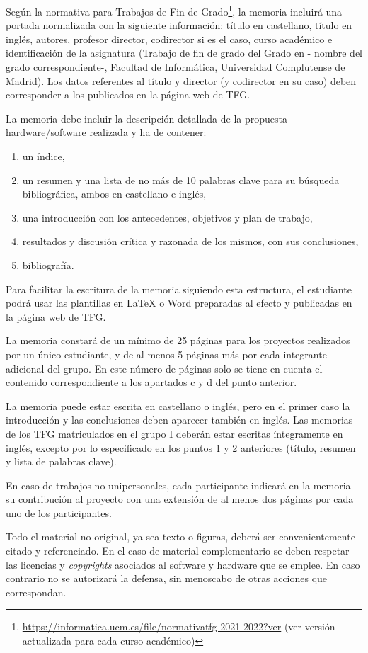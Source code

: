 Según la normativa  para Trabajos de Fin de Grado\footnote{\url{https://informatica.ucm.es/file/normativatfg-2021-2022?ver} (ver versión actualizada para cada curso académico)}, la memoria incluirá una portada normalizada con la siguiente información: título en castellano, título en inglés, autores, profesor director, codirector si es el caso, curso
académico e identificación de la asignatura (Trabajo de fin de grado del Grado en -
nombre del grado correspondiente-, Facultad de Informática, Universidad Complutense de Madrid). Los datos referentes al título y director (y codirector en su caso) deben corresponder a los publicados en la página web de TFG.

La memoria debe incluir la descripción detallada de la propuesta hardware/software realizada y ha de contener:
\begin{enumerate}
\renewcommand{\theenumi}{\alph{enumi}} %
	\item un índice,
	\item un resumen y una lista de no más de 10 palabras clave para su búsqueda bibliográfica, ambos en castellano e inglés,
	\item una introducción con los antecedentes, objetivos y plan de trabajo,
	\item resultados y discusión crítica y razonada de los mismos, con sus conclusiones,
	\item bibliografía.
\end{enumerate}
Para facilitar la escritura de la memoria siguiendo esta estructura, el estudiante podrá usar las plantillas en LaTeX o Word preparadas al efecto y publicadas en la página web de TFG.

La memoria constará de un mínimo de 25 páginas para los proyectos realizados por un único estudiante, y de al menos 5 páginas más por cada integrante adicional del grupo. En este número de páginas solo se tiene en cuenta el contenido correspondiente a los apartados c y d del punto anterior.

La memoria puede estar escrita en castellano o inglés, pero en el primer caso la introducción y las conclusiones deben aparecer también en inglés. Las memorias de los TFG matriculados en el grupo I deberán estar escritas íntegramente en inglés, excepto por lo especificado en los puntos 1 y 2 anteriores (título, resumen y lista de palabras clave).

En caso de trabajos no unipersonales, cada participante indicará en la memoria su contribución al proyecto con una extensión de al menos dos páginas por cada uno de los participantes.

Todo el material no original, ya sea texto o figuras, deberá ser convenientemente citado y referenciado. En el caso de material complementario se deben respetar las licencias y \emph{copyrights} asociados al software y hardware que se emplee. En caso contrario no se autorizará la defensa, sin menoscabo de otras acciones que correspondan.
